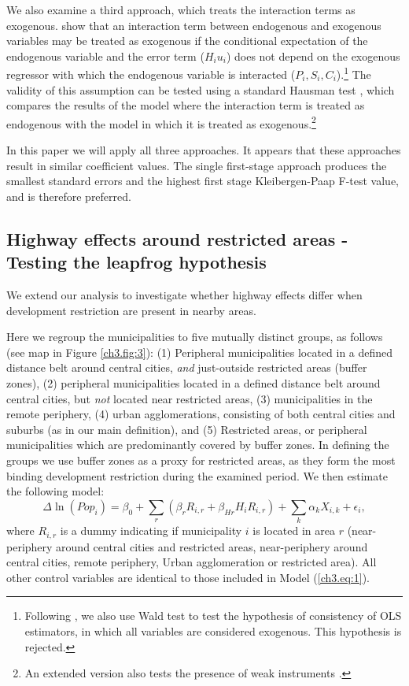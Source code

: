 \documentclass[a4paper,authoryear,review]{elsarticle}  	%
\begin{document}
	We also examine a third approach, which treats the interaction terms as exogenous. \citet{Bun2014} show that an interaction term between endogenous and exogenous variables may be treated as exogenous if the conditional expectation of the endogenous variable and the error term ($H_{i}u_i$) does not depend on the exogenous regressor with which the endogenous variable is interacted ($P_i,S_i,C_i$).\footnote{Following \citet{Bun2014}, we also use Wald test to test the hypothesis of consistency of OLS estimators, in which all variables are considered exogenous. This hypothesis is rejected.} The validity of this assumption can be tested using a standard Hausman test \citep{Hausman1978s}, which compares the results of the model where the interaction term is treated as endogenous with the model in which it is treated as exogenous.\footnote{An extended version also tests the presence of weak instruments \citep{Bun2014,Hahn2011}.} 
	
	In this paper we will apply all three approaches. It appears that these approaches result in similar coefficient values. The single first-stage approach produces the smallest standard errors and the highest first stage Kleibergen-Paap F-test value, and is therefore preferred. 
	
\subsection{Highway effects around restricted areas - Testing the leapfrog hypothesis}\label{sec:method.belt}
	We extend our analysis to investigate whether highway effects differ when development restriction are present in nearby areas. 
	
	Here we regroup the municipalities to five mutually distinct groups, as follows (see map in Figure \ref{ch3.fig:3}): (1) Peripheral municipalities located in a defined distance belt around central cities, \emph{and} just-outside restricted areas (buffer zones), (2) peripheral municipalities located in a defined distance belt around central cities, but \emph{not} located near restricted areas, (3) municipalities in the remote periphery, (4) urban agglomerations, consisting of both central cities and suburbs (as in our main definition), and (5) Restricted areas, or peripheral municipalities which are predominantly covered by buffer zones. In defining the groups we use buffer zones as a proxy for restricted areas, as they form the most binding development restriction during the examined period. We then estimate the following model: 	
	\begin{equation}\label{ch3.eq:3}
		\Delta\ln(Pop_i) = \beta_0+ \sum_{r}(\beta_{r}R_{i,r} + \beta_{Hr}H_{i}R_{i,r}) + \sum_{k}\alpha_{k} X_{i,k} + \epsilon_i ,
	\end{equation}
	where $R_{i,r}$	is a dummy indicating if municipality $i$ is located in area $r$ (near-periphery around central cities and restricted areas, near-periphery around central cities, remote periphery, Urban agglomeration or restricted area). All other control variables are identical to those included in Model (\ref{ch3.eq:1}).	
	
\end{document}
